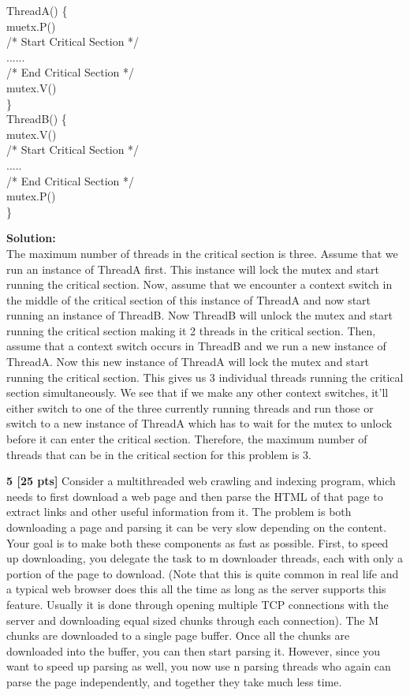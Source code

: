 \documentclass[12pt]{article}
\newcommand\tab[1][1cm]{\hspace*{#1}}
\begin{document}
\noindent ThreadA() \{\\
\tab muetx.P()\\
\tab /* Start Critical Section */\\
\tab ......\\
\tab /* End Critical Section */\\
\tab mutex.V()\\
\}\\

\noindent ThreadB() \{ \\
\tab mutex.V() \\
\tab /* Start Critical Section */\\
\tab .....\\
\tab /* End Critical Section */ \\
\tab mutex.P()\\
\}

{\bf Solution:}\\

The maximum number of threads in the critical section is three. Assume that we run an instance of ThreadA first. This instance will lock the mutex and start running the critical section. Now, assume that we encounter a context switch in the middle of the critical section of this instance of ThreadA and now start running an instance of ThreadB. Now ThreadB will unlock the mutex and start running the critical section making it 2 threads in the critical section. Then, assume that a context switch occurs in ThreadB and we run a new instance of ThreadA. Now this new instance of ThreadA will lock the mutex and start running the critical section. This gives us 3 individual threads running the critical section simultaneously. We see that if we make any other context switches, it'll either switch to one of the three currently running threads and run those or switch to a new instance of ThreadA which has to wait for the mutex to unlock before it can enter the critical section. Therefore, the maximum number of threads that can be in the critical section for this problem is 3. 

{\bf 5 [25 pts]} Consider a multithreaded web crawling and indexing program, which needs to first download a web page and then parse the HTML of that page to extract links and other useful information from it. The problem is both downloading a page and parsing it can be very slow depending on the content. Your goal is to make both these components as fast as possible. First, to speed up downloading, you delegate the task to m downloader threads, each with only a portion of the page to download. (Note that this is quite common in real life and a typical web browser does this all the time as long as the server supports this feature. Usually it is done through opening multiple TCP connections with the server and downloading equal sized chunks through each connection). The M chunks are downloaded to a single page buffer. Once all the chunks are downloaded into the buffer, you can then start parsing it. However, since you want to speed up parsing as well, you now use n parsing threads who again can parse the page independently, and together they take much less time.   
\end{document}
